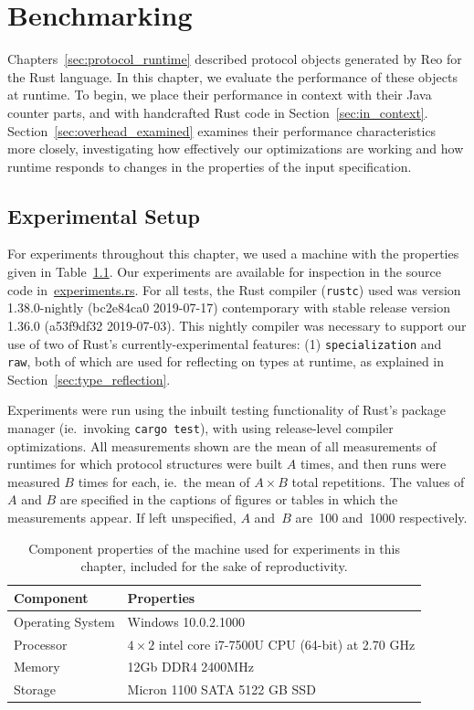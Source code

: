 \chapter{Benchmarking}
\label{sec:benchmarking}

Chapters~\ref{sec:protocol_runtime} described protocol objects generated by Reo for the Rust language. In this chapter, we evaluate the performance of these objects at runtime. To begin, we place their performance in context with their Java counter parts, and with handcrafted Rust code in Section~\ref{sec:in_context}. Section~\ref{sec:overhead_examined} examines their performance characteristics more closely, investigating how effectively our optimizations are working and how runtime responds to changes in the properties of the input specification.

\section{Experimental Setup}
For experiments throughout this chapter, we used a machine with the properties given in Table~\ref{tab:nomad}. Our experiments are available for inspection in the source code in~\url{experiments.rs}. For all tests, the Rust compiler (\texttt{rustc}) used was version 1.38.0-nightly (bc2e84ca0 2019-07-17) contemporary with stable release version 1.36.0 (a53f9df32 2019-07-03). This nightly compiler was necessary to support our use of two of Rust's currently-experimental features: (1) \texttt{specialization} and \texttt{raw}, both of which are used for reflecting on types at runtime, as explained in Section~\ref{sec:type_reflection}.

Experiments were run using the inbuilt testing functionality of Rust's package manager (ie.\ invoking \texttt{cargo test}), with using release-level compiler optimizations. All measurements shown are the mean of all measurements of runtimes for which protocol structures were built $A$ times, and then runs were measured $B$ times for each, ie.\ the mean of $A\times{}B$ total repetitions. The values of $A$ and $B$ are specified in the captions of figures or tables in which the measurements appear. If left unspecified, $A$ and~$B$ are~100 and~1000 respectively.

\begin{table}[]
	\begin{tabular}{l|l}
		Component & Properties \\ \hline
		Operating System 	& Windows 10.0.2.1000 \\
		Processor	& $4\times{2}$ intel core i7-7500U CPU (64-bit) at 2.70 GHz \\
		Memory 	& 12Gb  DDR4 2400MHz \\
		Storage & Micron 1100 SATA 5122 GB SSD  \\
		
	\end{tabular}
	\caption{Component properties of the machine used for experiments in this chapter, included for the sake of reproductivity.}
	\label{tab:nomad}
\end{table}

